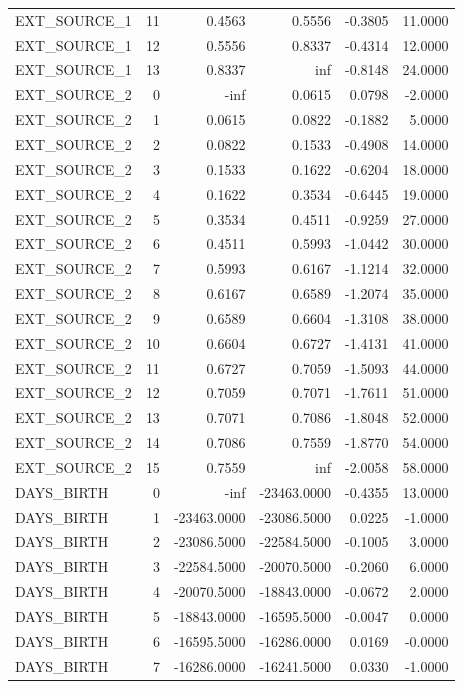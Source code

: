 \begin{tabular}{lrrrrr}
EXT_SOURCE_1 & 11 & 0.4563 & 0.5556 & -0.3805 & 11.0000 \\
EXT_SOURCE_1 & 12 & 0.5556 & 0.8337 & -0.4314 & 12.0000 \\
EXT_SOURCE_1 & 13 & 0.8337 & inf & -0.8148 & 24.0000 \\
EXT_SOURCE_2 & 0 & -inf & 0.0615 & 0.0798 & -2.0000 \\
EXT_SOURCE_2 & 1 & 0.0615 & 0.0822 & -0.1882 & 5.0000 \\
EXT_SOURCE_2 & 2 & 0.0822 & 0.1533 & -0.4908 & 14.0000 \\
EXT_SOURCE_2 & 3 & 0.1533 & 0.1622 & -0.6204 & 18.0000 \\
EXT_SOURCE_2 & 4 & 0.1622 & 0.3534 & -0.6445 & 19.0000 \\
EXT_SOURCE_2 & 5 & 0.3534 & 0.4511 & -0.9259 & 27.0000 \\
EXT_SOURCE_2 & 6 & 0.4511 & 0.5993 & -1.0442 & 30.0000 \\
EXT_SOURCE_2 & 7 & 0.5993 & 0.6167 & -1.1214 & 32.0000 \\
EXT_SOURCE_2 & 8 & 0.6167 & 0.6589 & -1.2074 & 35.0000 \\
EXT_SOURCE_2 & 9 & 0.6589 & 0.6604 & -1.3108 & 38.0000 \\
EXT_SOURCE_2 & 10 & 0.6604 & 0.6727 & -1.4131 & 41.0000 \\
EXT_SOURCE_2 & 11 & 0.6727 & 0.7059 & -1.5093 & 44.0000 \\
EXT_SOURCE_2 & 12 & 0.7059 & 0.7071 & -1.7611 & 51.0000 \\
EXT_SOURCE_2 & 13 & 0.7071 & 0.7086 & -1.8048 & 52.0000 \\
EXT_SOURCE_2 & 14 & 0.7086 & 0.7559 & -1.8770 & 54.0000 \\
EXT_SOURCE_2 & 15 & 0.7559 & inf & -2.0058 & 58.0000 \\
DAYS_BIRTH & 0 & -inf & -23463.0000 & -0.4355 & 13.0000 \\
DAYS_BIRTH & 1 & -23463.0000 & -23086.5000 & 0.0225 & -1.0000 \\
DAYS_BIRTH & 2 & -23086.5000 & -22584.5000 & -0.1005 & 3.0000 \\
DAYS_BIRTH & 3 & -22584.5000 & -20070.5000 & -0.2060 & 6.0000 \\
DAYS_BIRTH & 4 & -20070.5000 & -18843.0000 & -0.0672 & 2.0000 \\
DAYS_BIRTH & 5 & -18843.0000 & -16595.5000 & -0.0047 & 0.0000 \\
DAYS_BIRTH & 6 & -16595.5000 & -16286.0000 & 0.0169 & -0.0000 \\
DAYS_BIRTH & 7 & -16286.0000 & -16241.5000 & 0.0330 & -1.0000 \\

\end{tabular}
